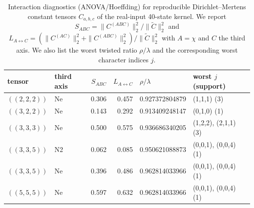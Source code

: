 \begin{table}[H]
\centering
\scriptsize
\setlength{\tabcolsep}{6pt}
\caption{Interaction diagnostics (ANOVA/Hoeffding) for reproducible Dirichlet--Mertens constant tensors $C_{a,b,c}$ of the real-input 40-state kernel. We report $S_{ABC}=\|C^{(ABC)}\|_2^2/\|\widetilde C\|_2^2$ and $L_{A\leftrightarrow C}=(\|C^{(AC)}\|_2^2+\|C^{(ABC)}\|_2^2)/\|\widetilde C\|_2^2$ with $A=\chi$ and $C$ the third axis. We also list the worst twisted ratio $\rho/\lambda$ and the corresponding worst character indices $j$.}
\label{tab:real_input_40_dirichlet_mertens_tensor_anova}
\begin{tabular}{l l r r l l}
\toprule
tensor & third axis & $S_{ABC}$ & $L_{A\leftrightarrow C}$ & $\rho/\lambda$ & worst $j$ (support)\\
\midrule
$((2,2,2))$ & Ne & 0.306 & 0.457 & 0.927372804879 & (1,1,1) (3)\\
$((3,2,2))$ & Ne & 0.143 & 0.292 & 0.913409248147 & (0,1,0) (1)\\
$((3,3,3))$ & Ne & 0.500 & 0.575 & 0.936686340205 & (1,2,2), (2,1,1) (3)\\
$((3,3,5))$ & N2 & 0.062 & 0.085 & 0.950621088873 & (0,0,1), (0,0,4) (1)\\
$((3,3,5))$ & Ne & 0.396 & 0.486 & 0.962814033966 & (0,0,1), (0,0,4) (1)\\
$((5,5,5))$ & Ne & 0.597 & 0.632 & 0.962814033966 & (0,0,1), (0,0,4) (1)\\
\bottomrule
\end{tabular}
\end{table}
